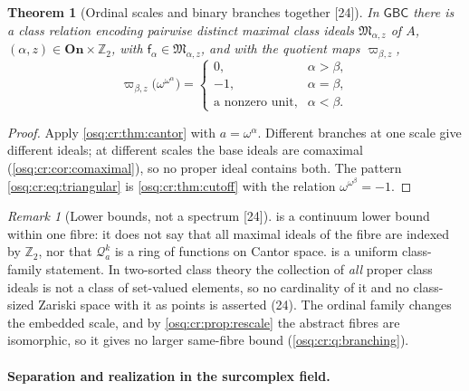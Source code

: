 \documentclass[11pt,letterpaper]{article}
\numberwithin{equation}{section}
\newtheorem{theorem}{Theorem}[section]
\theoremstyle{definition}
\theoremstyle{remark}
\newtheorem{remark}[remark]{Remark}
\theoremstyle{plain}
\newcommand{\On}{\mathbf{On}}
\newcommand{\Z}{\mathbb Z}
\newcommand{\Qa}{\mathcal Q}         %
\newcommand{\src}[1]{\textup{\textsf{[#1]}}}
\begin{document}
\begin{theorem}[Ordinal scales and binary branches together \src{24}]\label{osq:cr:thm:twoaxes}
In $\mathsf{GBC}$ there is a class relation encoding pairwise distinct maximal class ideals $\mathfrak M_{\alpha,z}$ of $A$, $(\alpha,z)\in\On\times\Z_2$,
with $\mathsf f_\alpha\in\mathfrak M_{\alpha,z}$, and with the quotient maps $\varpi_{\beta,z}$,
\begin{equation}\label{osq:cr:eq:triangular}
 \varpi_{\beta,z}\bigl(\omega^{\omega^\alpha}\bigr)=
 \begin{cases}
 0,&\alpha>\beta,\\
 -1,&\alpha=\beta,\\
 \text{a nonzero unit},&\alpha<\beta.
 \end{cases}
\end{equation}
\end{theorem}
\begin{proof}
Apply \cref{osq:cr:thm:cantor} with $a=\omega^\alpha$. Different branches at one scale give different ideals; at different scales the base ideals are
comaximal (\cref{osq:cr:cor:comaximal}), so no proper ideal contains both. The pattern \eqref{osq:cr:eq:triangular} is \cref{osq:cr:thm:cutoff} with the
relation $\omega^{\omega^\beta}=-1$.
\end{proof}

\begin{remark}[Lower bounds, not a spectrum \src{24}]\label{osq:cr:rem:lower}
 is a continuum lower bound within one fibre: it does not say that all maximal ideals of the fibre are indexed by $\Z_2$, nor that
$\Qa^k_a$ is a ring of functions on Cantor space.  is a uniform class-family statement. In two-sorted class theory the
collection of \emph{all} proper class ideals is not a class of set-valued elements, so no cardinality of it and no class-sized Zariski space with it as
points is asserted (24). The ordinal family changes the embedded scale, and by \cref{osq:cr:prop:rescale} the abstract fibres are isomorphic, so it
gives no larger same-fibre bound (\cref{osq:cr:q:branching}).
\end{remark}

\paragraph{Separation and realization in the surcomplex field.}
\end{document}
